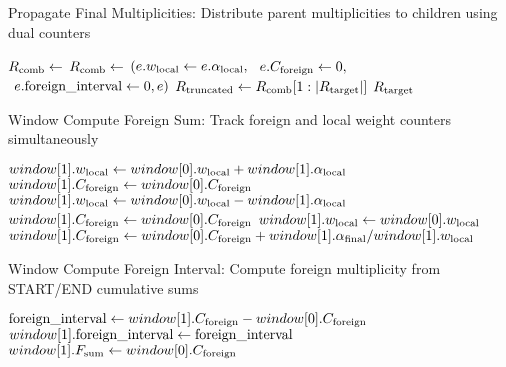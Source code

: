 \begin{algorithm}[H]
\caption{Propagate Final Multiplicities: Distribute parent multiplicities to children using dual counters}
\label{alg:propagate-final}
\begin{algorithmic}[1]
    \State $R_{\text{comb}} \leftarrow$ 
    \State $R_{\text{comb}} \leftarrow$ 
    \State \quad $(e.w_{\text{local}} \leftarrow e.\alpha_{\text{local}},$
    \State \quad $\phantom{(}e.C_{\text{foreign}} \leftarrow 0,$
    \State \quad $\phantom{(}e.\text{foreign\_interval} \leftarrow 0, e)$
    \State {}
    \State {}
    \State {}  
    \State {}
    \State {}
    \State $R_{\text{truncated}} \leftarrow R_{\text{comb}}[1:|R_{\text{target}}|]$
    \State {}
    \State \Return $R_{\text{target}}$
\EndFunction
\end{algorithmic}
\end{algorithm}

\begin{algorithm}[H]
\caption{Window Compute Foreign Sum: Track foreign and local weight counters simultaneously}
\label{alg:window-compute-foreign-sum}
\begin{algorithmic}[1]
        \State $window[1].w_{\text{local}} \leftarrow window[0].w_{\text{local}} + window[1].\alpha_{\text{local}}$
        \State $window[1].C_{\text{foreign}} \leftarrow window[0].C_{\text{foreign}}$
        \State $window[1].w_{\text{local}} \leftarrow window[0].w_{\text{local}} - window[1].\alpha_{\text{local}}$
        \State $window[1].C_{\text{foreign}} \leftarrow window[0].C_{\text{foreign}}$
        \State $window[1].w_{\text{local}} \leftarrow window[0].w_{\text{local}}$
        \State $window[1].C_{\text{foreign}} \leftarrow window[0].C_{\text{foreign}} + window[1].\alpha_{\text{final}} / window[1].w_{\text{local}}$
    \EndIf
\EndFunction
\end{algorithmic}
\end{algorithm}

\begin{algorithm}[H]
\caption{Window Compute Foreign Interval: Compute foreign multiplicity from START/END cumulative sums}
\label{alg:window-compute-foreign-interval}
\begin{algorithmic}[1]
        \State $\text{foreign\_interval} \leftarrow window[1].C_{\text{foreign}} - window[0].C_{\text{foreign}}$
        \State $window[1].\text{foreign\_interval} \leftarrow \text{foreign\_interval}$
        \State $window[1].F_{\text{sum}} \leftarrow window[0].C_{\text{foreign}}$ 
    \EndIf
\EndFunction
\end{algorithmic}
\end{algorithm}

